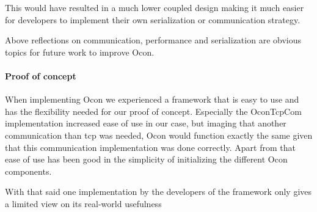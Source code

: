 \documentclass[../report.tex]{subfiles}
\begin{document}
This would have resulted in a much lower coupled design making it much easier for developers to implement their own serialization or communication strategy.

Above reflections on communication, performance and serialization are obvious topics for future work to improve Ocon.

\paragraph{Proof of concept}
When implementing Ocon we experienced a framework that is easy to use and has the flexibility needed for our proof of concept. Especially the OconTcpCom implementation increased ease of use in our case, but imaging that another communication than tcp was needed, Ocon would function exactly the same given that this communication implementation was done correctly. Apart from that ease of use has been good in the simplicity of initializing the different Ocon components.

With that said one implementation by the developers of the framework only gives a limited view on its real-world usefulness
\end{document}
